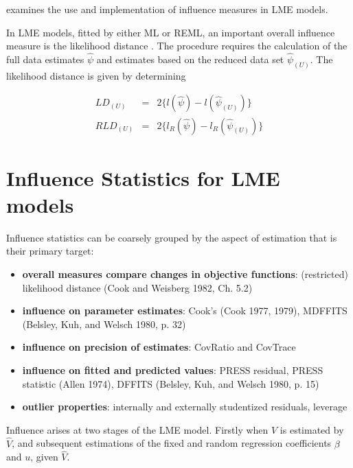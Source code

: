 \documentclass[12pt, a4paper]{report}
\theoremstyle{plain}
\theoremstyle{definition}
\theoremstyle{remark}
\begin{document}
\citet{schabenberger} examines the use and implementation of
influence measures in LME models.













In LME models, fitted by either ML or REML, an important overall
influence measure is the likelihood distance \citep{cook82}. The
procedure requires the calculation of the full data estimates
$\hat{\psi}$ and estimates based on the reduced data set
$\hat{\psi}_{(U)}$. The likelihood distance is given by
determining


\begin{eqnarray}
	LD_{(U)} &=& 2\{l(\hat{\psi}) - l( \hat{\psi}_{(U)}) \}\\
	RLD_{(U)} &=& 2\{l_{R}(\hat{\psi}) - l_{R}(\hat{\psi}_{(U)})\}
\end{eqnarray}





\section{Influence Statistics for LME models} %
Influence statistics can be coarsely grouped by the aspect of estimation that is their primary target:
\begin{itemize}
	\item \textbf{overall measures compare changes in objective functions}: (restricted) likelihood distance (Cook and Weisberg 1982, Ch. 5.2)
	\item \textbf{influence on parameter estimates}: Cook's  (Cook 1977, 1979), MDFFITS (Belsley, Kuh, and Welsch 1980, p. 32)
	\item \textbf{influence on precision of estimates}: CovRatio and CovTrace
	\item \textbf{influence on fitted and predicted values}: PRESS residual, PRESS statistic (Allen 1974), DFFITS (Belsley, Kuh, and Welsch 1980, p. 15)
	\item \textbf{outlier properties}: internally and externally studentized residuals, leverage
\end{itemize}

Influence arises at two stages of the LME model. Firstly when $V$ is estimated by $\hat{V}$, and subsequent
estimations of the fixed and random regression coefficients $\beta$ and $u$, given $\hat{V}$.
\end{document}

